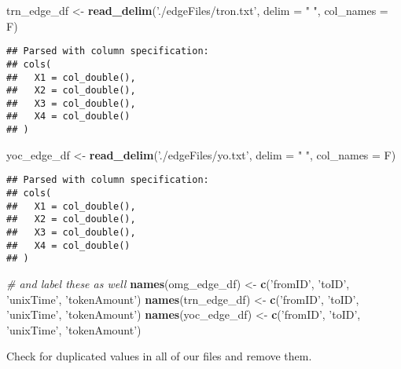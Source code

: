 \documentclass[]{article}
\newenvironment{Shaded}{\begin{snugshade}}{\end{snugshade}}
\newcommand{\KeywordTok}[1]{\textcolor[rgb]{0.13,0.29,0.53}{\textbf{#1}}}
\newcommand{\DataTypeTok}[1]{\textcolor[rgb]{0.13,0.29,0.53}{#1}}
\newcommand{\StringTok}[1]{\textcolor[rgb]{0.31,0.60,0.02}{#1}}
\newcommand{\CommentTok}[1]{\textcolor[rgb]{0.56,0.35,0.01}{\textit{#1}}}
\newcommand{\NormalTok}[1]{#1}
\begin{document}
\begin{Shaded}
\begin{Highlighting}[]
\NormalTok{trn_edge_df <-}\StringTok{ }\KeywordTok{read_delim}\NormalTok{(}\StringTok{'./edgeFiles/tron.txt'}\NormalTok{,    }\DataTypeTok{delim =} \StringTok{" "}\NormalTok{, }\DataTypeTok{col_names =}\NormalTok{ F)}
\end{Highlighting}
\end{Shaded}

\begin{verbatim}
## Parsed with column specification:
## cols(
##   X1 = col_double(),
##   X2 = col_double(),
##   X3 = col_double(),
##   X4 = col_double()
## )
\end{verbatim}

\begin{Shaded}
\begin{Highlighting}[]
\NormalTok{yoc_edge_df <-}\StringTok{ }\KeywordTok{read_delim}\NormalTok{(}\StringTok{'./edgeFiles/yo.txt'}\NormalTok{,      }\DataTypeTok{delim =} \StringTok{" "}\NormalTok{, }\DataTypeTok{col_names =}\NormalTok{ F)}
\end{Highlighting}
\end{Shaded}

\begin{verbatim}
## Parsed with column specification:
## cols(
##   X1 = col_double(),
##   X2 = col_double(),
##   X3 = col_double(),
##   X4 = col_double()
## )
\end{verbatim}

\begin{Shaded}
\begin{Highlighting}[]
\CommentTok{# and label these as well}
\KeywordTok{names}\NormalTok{(omg_edge_df) <-}\StringTok{ }\KeywordTok{c}\NormalTok{(}\StringTok{'fromID'}\NormalTok{, }\StringTok{'toID'}\NormalTok{, }\StringTok{'unixTime'}\NormalTok{, }\StringTok{'tokenAmount'}\NormalTok{)}
\KeywordTok{names}\NormalTok{(trn_edge_df) <-}\StringTok{ }\KeywordTok{c}\NormalTok{(}\StringTok{'fromID'}\NormalTok{, }\StringTok{'toID'}\NormalTok{, }\StringTok{'unixTime'}\NormalTok{, }\StringTok{'tokenAmount'}\NormalTok{)}
\KeywordTok{names}\NormalTok{(yoc_edge_df) <-}\StringTok{ }\KeywordTok{c}\NormalTok{(}\StringTok{'fromID'}\NormalTok{, }\StringTok{'toID'}\NormalTok{, }\StringTok{'unixTime'}\NormalTok{, }\StringTok{'tokenAmount'}\NormalTok{)}
\end{Highlighting}
\end{Shaded}

Check for duplicated values in all of our files and remove them.
\end{document}
